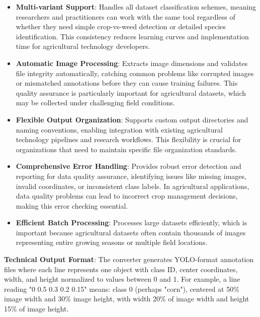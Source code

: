 \begin{itemize}
    \item \textbf{Multi-variant Support}: Handles all dataset classification schemes, meaning researchers and practitioners can work with the same tool regardless of whether they need simple crop-vs-weed detection or detailed species identification. This consistency reduces learning curves and implementation time for agricultural technology developers.
    
    \item \textbf{Automatic Image Processing}: Extracts image dimensions and validates file integrity automatically, catching common problems like corrupted images or mismatched annotations before they can cause training failures. This quality assurance is particularly important for agricultural datasets, which may be collected under challenging field conditions.
    
    \item \textbf{Flexible Output Organization}: Supports custom output directories and naming conventions, enabling integration with existing agricultural technology pipelines and research workflows. This flexibility is crucial for organizations that need to maintain specific file organization standards.
    
    \item \textbf{Comprehensive Error Handling}: Provides robust error detection and reporting for data quality assurance, identifying issues like missing images, invalid coordinates, or inconsistent class labels. In agricultural applications, data quality problems can lead to incorrect crop management decisions, making this error checking essential.
    
    \item \textbf{Efficient Batch Processing}: Processes large datasets efficiently, which is important because agricultural datasets often contain thousands of images representing entire growing seasons or multiple field locations.
\end{itemize}

\textbf{Technical Output Format}: The converter generates YOLO-format annotation files where each line represents one object with class ID, center coordinates, width, and height normalized to values between 0 and 1. For example, a line reading "0 0.5 0.3 0.2 0.15" means: class 0 (perhaps "corn"), centered at 50\% image width and 30\% image height, with width 20\% of image width and height 15\% of image height.

